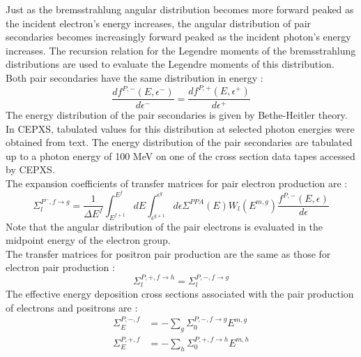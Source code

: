 Just as the bremsstrahlung angular distribution becomes more forward peaked as
the incident electron's energy increases, the angular distribution of pair
secondaries becomes increasingly forward peaked as the incident photon's
energy increases. The recursion relation for the Legendre moments of the
bremsstrahlung distributions are used to evaluate the Legendre moments of this
distribution.\\
Both pair secondaries have the same distribution in energy :
\begin{equation}
\frac{df^{P,-}(E,\epsilon^-)}{d\epsilon^-} = \frac{df^{P,+}(E,\epsilon^+)}{d\epsilon^+}
\end{equation}
The energy distribution of the pair secondaries is given by Bethe-Heitler
theory. In CEPXS, tabulated values for this distribution at selected photon
energies were obtained from text. The energy distribution of the pair
secondaries are tabulated up to a photon energy of 100 MeV on one of the cross
section data tapes accessed by CEPXS.\\
The expansion coefficients of transfer matrices for pair electron production
are :
\begin{equation}
\Sigma_l^{P^-,f\rightarrow g} = \frac{1}{\Delta E^f} \int_{E^{f+1}}^{E^f} dE
\int_{\epsilon^{g+1}}^{\epsilon^g} d\epsilon \Sigma^{PPA}(E) W_l(E^{m,g})
\frac{f^{P,-}(E,\epsilon)}{d\epsilon}
\end{equation}
Note that the angular distribution of the pair electrons is evaluated in the
midpoint energy of the electron group.\\
The transfer matrices for positron pair production are the same as those for
electron pair production :
\begin{equation}
\Sigma_l^{P,+,f\rightarrow h} = \Sigma_l^{P,-,f\rightarrow g}
\end{equation}
The effective energy deposition cross sections associated with the pair
production of electrons and positrons are :
\begin{align}
\Sigma_E^{P,-,f} &= -\sum_g \Sigma_0^{P,-,f\rightarrow g} E^{m,g}\\
\Sigma_E^{P,+,f} &= -\sum_h \Sigma_0^{P,+,f\rightarrow h} E^{m,h}
\end{align}

